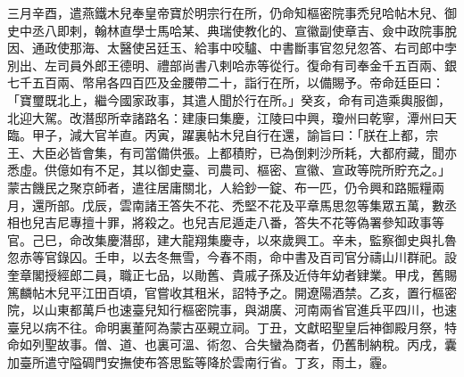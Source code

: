 \begin{pinyinscope}
 三月辛酉，遣燕鐵木兒奉皇帝寶於明宗行在所，仍命知樞密院事禿兒哈帖木兒、御史中丞八即剌，翰林直學士馬哈某、典瑞使教化的、宣徽副使章吉、僉中政院事脫因、通政使那海、太醫使呂廷玉、給事中咬驢、中書斷事官忽兒忽答、右司郎中孛別出、左司員外郎王德明、禮部尚書八剌哈赤等從行。復命有司奉金千五百兩、銀七千五百兩、幣帛各四百匹及金腰帶二十，詣行在所，以備賜予。帝命廷臣曰：「寶璽既北上，繼今國家政事，其遣人聞於行在所。」癸亥，命有司造乘輿服御，北迎大駕。改潛邸所幸諸路名：建康曰集慶，江陵曰中興，瓊州曰乾寧，潭州曰天臨。甲子，減大官羊直。丙寅，躍裏帖木兒自行在還，諭旨曰：「朕在上都，宗王、大臣必皆會集，有司當備供張。上都積貯，已為倒剌沙所耗，大都府藏，聞亦悉虛。供億如有不足，其以御史臺、司農司、樞密、宣徽、宣政等院所貯充之。」蒙古饑民之聚京師者，遣往居庸關北，人給鈔一錠、布一匹，仍令興和路賑糧兩月，還所部。戊辰，雲南諸王答失不花、禿堅不花及平章馬思忽等集眾五萬，數丞相也兒吉尼專擅十罪，將殺之。也兒吉尼遁走八番，答失不花等偽署參知政事等官。己巳，命改集慶潛邸，建大龍翔集慶寺，以來歲興工。辛未，監察御史與扎魯忽赤等官錄囚。壬申，以去冬無雪，今春不雨，命中書及百司官分禱山川群祀。設奎章閣授經郎二員，職正七品，以勛舊、貴戚子孫及近侍年幼者肄業。甲戌，舊賜篤麟帖木兒平江田百頃，官嘗收其租米，詔特予之。開遼陽酒禁。乙亥，置行樞密院，以山東都萬戶也速臺兒知行樞密院事，與湖廣、河南兩省官進兵平四川，也速臺兒以病不往。命明裏董阿為蒙古巫覡立祠。丁丑，文獻昭聖皇后神御殿月祭，特命如列聖故事。僧、道、也裏可溫、術忽、合失蠻為商者，仍舊制納稅。丙戌，囊加臺所遣守隘碉門安撫使布答思監等降於雲南行省。丁亥，雨土，霾。




\end{pinyinscope}
